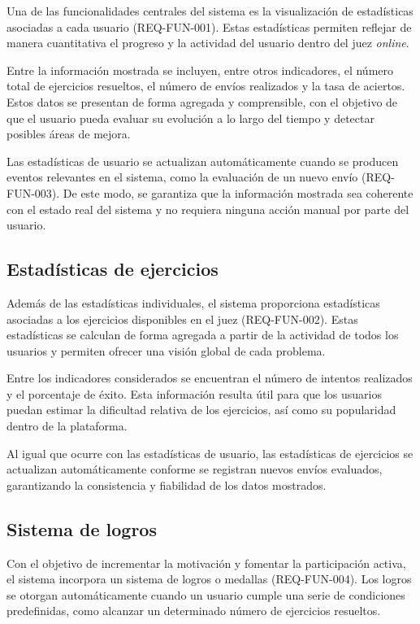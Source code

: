 Una de las funcionalidades centrales del sistema es la visualización de estadísticas asociadas a cada usuario (REQ-FUN-001). Estas estadísticas permiten reflejar de manera cuantitativa el progreso y la actividad del usuario dentro del juez \textit{online}.

Entre la información mostrada se incluyen, entre otros indicadores, el número total de ejercicios resueltos, el número de envíos realizados y la tasa de aciertos. Estos datos se presentan de forma agregada y comprensible, con el objetivo de que el usuario pueda evaluar su evolución a lo largo del tiempo y detectar posibles áreas de mejora.

Las estadísticas de usuario se actualizan automáticamente cuando se producen eventos relevantes en el sistema, como la evaluación de un nuevo envío (REQ-FUN-003). De este modo, se garantiza que la información mostrada sea coherente con el estado real del sistema y no requiera ninguna acción manual por parte del usuario.

\subsection{Estadísticas de ejercicios}

Además de las estadísticas individuales, el sistema proporciona estadísticas asociadas a los ejercicios disponibles en el juez (REQ-FUN-002). Estas estadísticas se calculan de forma agregada a partir de la actividad de todos los usuarios y permiten ofrecer una visión global de cada problema.

Entre los indicadores considerados se encuentran el número de intentos realizados y el porcentaje de éxito. Esta información resulta útil para que los usuarios puedan estimar la dificultad relativa de los ejercicios, así como su popularidad dentro de la plataforma.

Al igual que ocurre con las estadísticas de usuario, las estadísticas de ejercicios se actualizan automáticamente conforme se registran nuevos envíos evaluados, garantizando la consistencia y fiabilidad de los datos mostrados.

\subsection{Sistema de logros}

Con el objetivo de incrementar la motivación y fomentar la participación activa, el sistema incorpora un sistema de logros o medallas (REQ-FUN-004). Los logros se otorgan automáticamente cuando un usuario cumple una serie de condiciones predefinidas, como alcanzar un determinado número de ejercicios resueltos.

